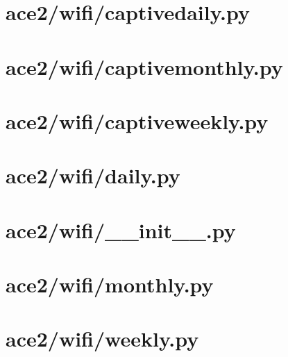\documentclass{article}
\begin{document}
\section*{ace2/wifi/captivedaily.py}


\section*{ace2/wifi/captivemonthly.py}


\section*{ace2/wifi/captiveweekly.py}


\section*{ace2/wifi/daily.py}


\section*{ace2/wifi/\_\_init\_\_.py}


\section*{ace2/wifi/monthly.py}


\section*{ace2/wifi/weekly.py}

\end{document}
